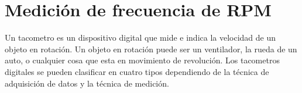 








\section{Medición de frecuencia de RPM} %
\label{sec:medicion_de_frecuencia_de_rpm}

Un tacometro es un dispositivo digital que mide e indica la velocidad de un objeto en rotación. Un objeto en rotación puede ser un ventilador, la rueda de un auto, o cualquier cosa que esta en movimiento de revolución. Los tacometros digitales se pueden clasificar en cuatro tipos dependiendo de la técnica de adquisición de datos y la técnica de medición.

